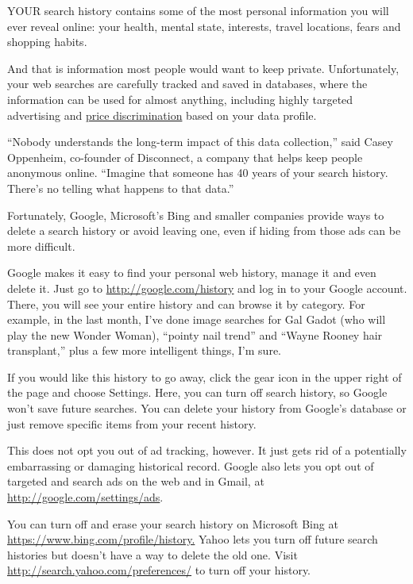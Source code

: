 YOUR search history contains some of the most personal information you
will ever reveal online: your health, mental state, interests, travel
locations, fears and shopping habits.

And that is information most people would want to keep private.
Unfortunately, your web searches are carefully tracked and saved in
databases, where the information can be used for almost anything,
including highly targeted advertising and
\href{http://www.forbes.com/sites/modeledbehavior/2013/09/01/will-big-data-bring-more-price-discrimination/}{price
discrimination} based on your data profile.

``Nobody understands the long-term impact of this data collection,''
said Casey Oppenheim, co-founder of Disconnect, a company that helps
keep people anonymous online. ``Imagine that someone has 40 years of
your search history. There's no telling what happens to that data.''

Fortunately, Google, Microsoft's Bing and smaller companies provide ways
to delete a search history or avoid leaving one, even if hiding from
those ads can be more difficult.

Google makes it easy to find your personal web history, manage it and
even delete it. Just go to \url{http://google.com/history} and log in to
your Google account. There, you will see your entire history and can
browse it by category. For example, in the last month, I've done image
searches for Gal Gadot (who will play the new Wonder Woman), ``pointy
nail trend'' and ``Wayne Rooney hair transplant,'' plus a few more
intelligent things, I'm sure.

If you would like this history to go away, click the gear icon in the
upper right of the page and choose Settings. Here, you can turn off
search history, so Google won't save future searches. You can delete
your history from Google's database or just remove specific items from
your recent history.

This does not opt you out of ad tracking, however. It just gets rid of a
potentially embarrassing or damaging historical record. Google also lets
you opt out of targeted and search ads on the web and in Gmail, at
\url{http://google.com/settings/ads}.

You can turn off and erase your search history on Microsoft Bing at
\href{https://www.bing.com/profile/history}{https://www.bing.com/profile/history.}
Yahoo lets you turn off future search histories but doesn't have a way
to delete the old one. Visit \url{http://search.yahoo.com/preferences/}
to turn off your history.

